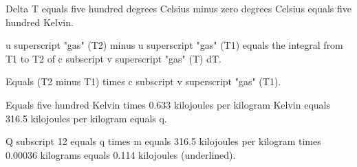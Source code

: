 Delta T equals five hundred degrees Celsius minus zero degrees Celsius equals five hundred Kelvin.  

u superscript "gas" (T2) minus u superscript "gas" (T1) equals the integral from T1 to T2 of c subscript v superscript "gas" (T) dT.  

Equals (T2 minus T1) times c subscript v superscript "gas" (T1).  

Equals five hundred Kelvin times 0.633 kilojoules per kilogram Kelvin equals 316.5 kilojoules per kilogram equals q.  

Q subscript 12 equals q times m equals 316.5 kilojoules per kilogram times 0.00036 kilograms equals 0.114 kilojoules (underlined).